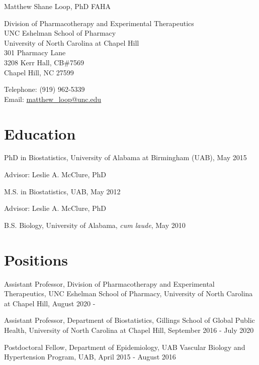 \documentclass[10pt,letterpaper]{article}
\def\name{Matthew Shane Loop, PhD FAHA}
\renewenvironment{itemize}{
  \begin{list}{}{
    \setlength{\leftmargin}{1.5em}
    \setlength{\itemsep}{0.25em}
    \setlength{\parskip}{0pt}
    \setlength{\parsep}{0.25em}
  }
}{
  \end{list}
}
\begin{document}
{\Huge \name}


\bigskip

\begin{minipage}[t]{0.6\textwidth}
  Division of Pharmacotherapy and Experimental Therapeutics \\
  UNC Eshelman School of Pharmacy\\
  University of North Carolina at Chapel Hill\\
  301 Pharmacy Lane\\
  3208 Kerr Hall, CB\#7569 \\
  Chapel Hill, NC 27599
\end{minipage}
\begin{minipage}[t]{0.5\textwidth}
  Telephone: (919) 962-5339\\
  Email: \href{mailto:matthew\_loop@unc.edu}{matthew\_loop@unc.edu} \\
\end{minipage}

\section*{Education}

\begin{itemize}
	\item PhD in Biostatistics, University of Alabama at Birmingham (UAB), May 2015
		\begin{itemize}
			\item Advisor: Leslie A. McClure, PhD
		\end{itemize}
	\item M.S. in Biostatistics, UAB, May 2012
		\begin{itemize}
			\item Advisor: Leslie A. McClure, PhD
		\end{itemize}
  	\item B.S. Biology, University of Alabama, \textit{cum laude}, May 2010
\end{itemize}

\section*{Positions}
\begin{itemize}
    \item Assistant Professor, Division of Pharmacotherapy and Experimental Therapeutics, UNC Eshelman School of Pharmacy, University of North Carolina at Chapel Hill, August 2020 - 
		\item Assistant Professor, Department of Biostatistics, Gillings School of Global Public Health, University of North Carolina at Chapel Hill, September 2016 - July 2020
	\item Postdoctoral Fellow, Department of Epidemiology, UAB Vascular Biology and Hypertension Program, UAB, April 2015 - August 2016
\end{itemize}
\end{document}
